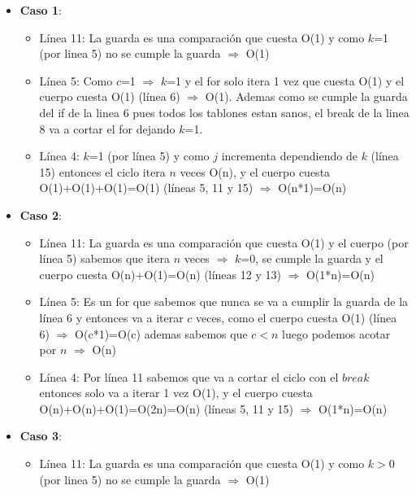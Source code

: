 \begin{itemize}
	\item \textbf{Caso 1}:
		\begin{itemize}
			\item Línea 11: La guarda es una comparación que cuesta O(1) y como $k$=1 (por linea 5) no se cumple la guarda $\Rightarrow$ O(1)
	
			\item Línea 5: Como $c$=1 $\Rightarrow$ $k$=1 y el for solo itera 1 vez que cuesta O(1) y el cuerpo cuesta O(1) (línea 6) $\Rightarrow$ O(1). Ademas como se cumple la guarda del if de la linea 6 pues todos los tablones estan sanos, el break de la linea 8 va a cortar el for dejando $k$=1.
	
	
			\item Línea 4: $k$=1 (por línea 5) y como $j$ incrementa dependiendo de $k$ (línea 15) entonces el ciclo itera $n$ veces O(n), y el cuerpo cuesta O(1)+O(1)+O(1)=O(1) (líneas 5, 11 y 15) $\Rightarrow$ O(n*1)=O(n)
		\end{itemize}
	
	
	
	
	\item \textbf{Caso 2}: 
		\begin{itemize}
			\item Línea 11: La guarda es una comparación que cuesta O(1) y el cuerpo (por línea 5) sabemos que itera $n$ veces $\Rightarrow$ $k$=0, se cumple la guarda y el cuerpo cuesta O(n)+O(1)=O(n) (líneas 12 y 13) $\Rightarrow$ O(1*n)=O(n)
			
			\item Línea 5: Es un for que sabemos que nunca se va a cumplir la guarda de la línea 6 y entonces va a iterar $c$ veces, como el cuerpo cuesta O(1) (línea 6) $\Rightarrow$ O(c*1)=O(c) ademas sabemos que $c<n$ luego podemos acotar por $n$ $\Rightarrow$ O(n)
			
			\item Línea 4: Por línea 11 sabemos que va a cortar el ciclo con el $break$ entonces solo va a iterar 1 vez O(1), y el cuerpo cuesta O(n)+O(n)+O(1)=O(2n)=O(n) (líneas 5, 11 y 15)  $\Rightarrow$ O(1*n)=O(n)
		\end{itemize}

	
	\item \textbf{Caso 3}: 
		\begin{itemize}	
			\item Línea 11: La guarda es una comparación que cuesta O(1) y como $k>$0 (por linea 5) no se cumple la guarda $\Rightarrow$ O(1)
			

\end{itemize}
\end{itemize}
